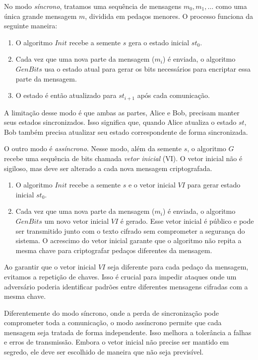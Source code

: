 No modo \textit{síncrono}, tratamos uma sequência de mensagens $m_0, m_1, \dots$ como uma única grande mensagem $m$, dividida em pedaços menores.
O processo funciona da seguinte maneira:

\begin{enumerate}
    \item O algoritmo $Init$ recebe a semente $s$ gera o estado inicial $st_0$.
    \item Cada vez que uma nova parte da mensagem ($m_i$) é enviada, o algoritmo $GenBits$ usa o estado atual para gerar os bits necessários para encriptar essa parte da mensagem.
    \item O estado é então atualizado para $st_{i+1}$ após cada comunicação.
\end{enumerate}

A limitação desse modo é que ambas as partes, Alice e Bob, precisam manter seus estados sincronizados.
Isso significa que, quando Alice atualiza o estado $st$, Bob também precisa atualizar seu estado correspondente de forma sincronizada.

O outro modo é {\em assíncrono}.
Nesse modo, além da semente $s$, o algoritmo $G$ recebe uma sequência de bits chamada {\em vetor inicial} (VI).
O vetor inicial não é sigiloso, mas deve ser alterado a cada nova mensagem criptografada.

\begin{enumerate}
    \item O algoritmo $Init$ recebe a semente $s$ e o vetor inicial $VI$ para gerar estado inicial $st_0$.
    \item Cada vez que uma nova parte da mensagem ($m_i$) é enviada, o algoritmo $GenBits$ um novo vetor inicial $VI$ é gerado.
      Esse vetor inicial é público e pode ser transmitido junto com o texto cifrado sem comprometer a segurança do sistema.
      O acrescimo do vetor inicial garante que o algoritmo não repita a mesma chave para criptografar pedaços diferentes da mensagem.
\end{enumerate}

Ao garantir que o vetor inicial $VI$ seja diferente para cada pedaço da mensagem, evitamos a repetição de chaves.
Isso é crucial para impedir ataques onde um adversário poderia identificar padrões entre diferentes mensagens cifradas com a mesma chave.

Diferentemente do modo síncrono, onde a perda de sincronização pode comprometer toda a comunicação, o modo assíncrono permite que cada mensagem seja tratada de forma independente.
Isso melhora a tolerância a falhas e erros de transmissão.
Embora o vetor inicial não precise ser mantido em segredo, ele deve ser escolhido de maneira que não seja previsível.

